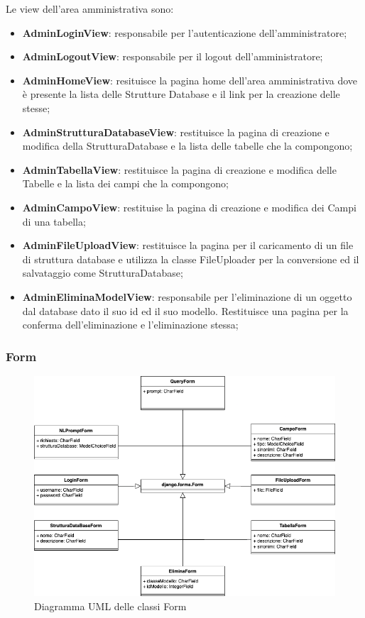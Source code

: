\documentclass[5pt]{article}
\begin{document}
	
	Le view dell'area amministrativa sono:
	\begin{itemize}
		\item \textbf{AdminLoginView}: responsabile per l'autenticazione dell'amministratore;
		\item \textbf{AdminLogoutView}: responsabile per il logout dell'amministratore;
		\item \textbf{AdminHomeView}: resituisce la pagina home dell'area amministrativa dove è presente la lista delle Strutture Database e il link per la creazione delle stesse;
		\item \textbf{AdminStrutturaDatabaseView}: restituisce la pagina di creazione e modifica della StrutturaDatabase e la lista delle tabelle che la compongono;
		\item \textbf{AdminTabellaView}: restituisce la pagina di creazione e modifica delle Tabelle e la lista dei campi che la compongono;
		\item \textbf{AdminCampoView}: restituise la pagina di creazione e modifica dei Campi di una tabella;
		\item \textbf{AdminFileUploadView}: restituisce la pagina per il caricamento di un file di struttura database e utilizza la classe FileUploader per la conversione ed il salvataggio come StrutturaDatabase;
		\item \textbf{AdminEliminaModelView}: responsabile per l'eliminazione di un oggetto dal database dato il suo id ed il suo modello. Restituisce una pagina per la conferma dell'eliminazione e l'eliminazione stessa;
	\end{itemize}
	
	\subsubsection{Form}
	\begin{figure}[H]
			\includegraphics[scale=0.65]{UML_classes/forms.png}
			\caption{Diagramma UML delle classi Form}
			\centering
	\end{figure}
\end{document}
